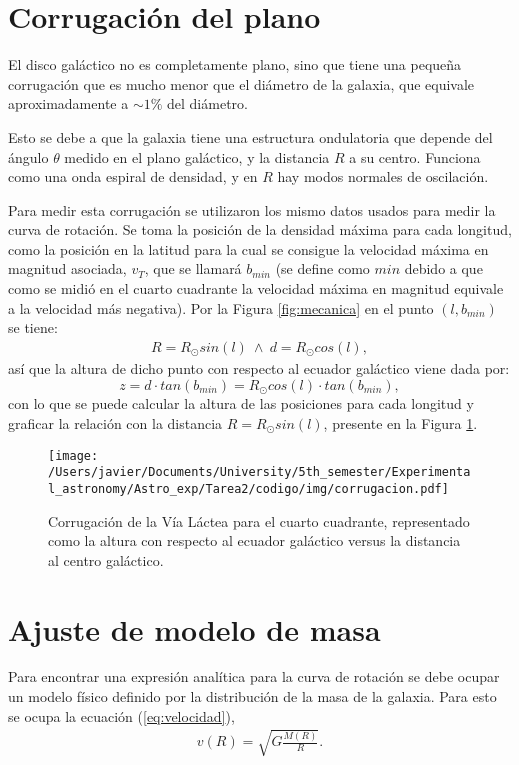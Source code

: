 \documentclass[letterpaper,oneside]{article}
\begin{document}
\section{Corrugación del plano}
El disco galáctico no es completamente plano, sino que tiene una pequeña corrugación que es mucho menor que el diámetro de la galaxia, que equivale aproximadamente a  $\sim 1\%$ del diámetro.

Esto se debe a que la galaxia tiene una estructura ondulatoria que depende del ángulo $\theta$ medido en el plano galáctico, y la distancia $R$ a su centro. Funciona como una onda espiral de densidad, y en $R$ hay modos normales de oscilación. %

Para medir esta corrugación se utilizaron los mismo datos usados para medir la curva de rotación. Se toma la posición de la densidad máxima para cada longitud, como la posición en la latitud para la cual se consigue la velocidad máxima en magnitud asociada, $v_{T}$, que se llamará $b_{min}$ (se define como $min$ debido a que como se midió en el cuarto cuadrante la velocidad máxima en magnitud equivale a la velocidad más negativa). Por la Figura \ref{fig:mecanica} en el punto $(l,b_{min})$ se tiene:
\begin{gather*}
R=R_{\odot}sin(l) \ \land \ d=R_{\odot}cos(l),
\end{gather*}
así que la altura de dicho punto con respecto al ecuador galáctico viene dada por:
\begin{equation*}
z=d\cdot tan(b_{min})=R_{\odot}cos(l)\cdot tan(b_{min}),
\end{equation*}
con lo que se puede calcular la altura de las posiciones para cada longitud y graficar la relación con la distancia $R=R_{\odot}sin(l)$, presente en la Figura \ref{fig:corrugacion}.

\begin{figure}[H]
    \centering
    \texttt{[image: /Users/javier/Documents/University/5th\_semester/Experimental\_astronomy/Astro\_exp/Tarea2/codigo/img/corrugacion.pdf]}
    \caption{Corrugación de la Vía Láctea para el cuarto cuadrante, representado como la altura con respecto al ecuador galáctico versus la distancia al centro galáctico.}
    \label{fig:corrugacion}
\end{figure}
\newpage
\section{Ajuste de modelo de masa}
Para encontrar una expresión analítica para la curva de rotación se debe ocupar un modelo físico definido por la distribución de la masa de la galaxia. Para esto se ocupa la ecuación (\ref{eq:velocidad}),
\begin{gather*}
v(R)=\sqrt{G\frac{M(R)}{R}}.
\end{gather*}
\end{document}
